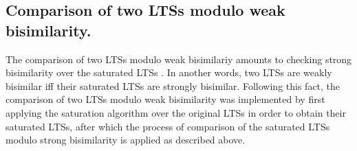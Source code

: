 \subsection{Comparison of two LTSs modulo weak bisimilarity.}
The comparison of two LTSs modulo weak bisimilariy amounts to checking strong bisimilarity over the saturated LTSs \cite{ReactiveSystems4}. In another words, two LTSs are weakly bisimilar iff their saturated LTSs are strongly bisimilar. Following this fact, the comparison of two LTSs modulo weak bisimilarity was implemented by first applying the saturation algorithm over the original LTSs in order to obtain their saturated LTSs, after which the process of comparison of the saturated LTSs modulo strong bisimilarity is applied as described above.
